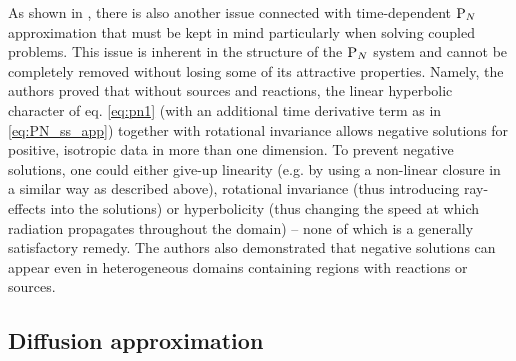 As shown in \cite{McClarren4}, there is also another issue connected with time-dependent $\text{P}_{N}$ approximation that must
be kept in mind particularly when solving coupled problems. This issue is inherent in the structure of the $\text{P}_{N}$ system
and cannot be completely removed without losing some of its attractive properties. Namely, the authors proved that
without sources and reactions, the linear hyperbolic character of eq. \eqref{eq:pn1} (with an additional time derivative
term as in \eqref{eq:PN_ss_app}) together with rotational invariance allows negative solutions for positive, isotropic
data in more than one dimension. To prevent negative solutions, one could either give-up linearity (e.g. by using a
non-linear closure in a similar way as described above), rotational invariance (thus introducing ray-effects into the solutions) or
hyperbolicity (thus changing the speed at which radiation propagates throughout the domain) -- none of which is a
generally satisfactory remedy. The authors also demonstrated that negative solutions can appear even in heterogeneous
domains containing regions with reactions or sources.




\subsection{Diffusion approximation}\label{sec:diffusion}

